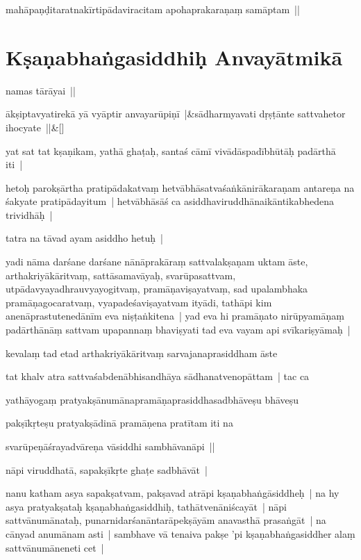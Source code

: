 \documentclass[article,12pt,a4paper]{memoir}
\begin{document}
	  \pstart mahāpaṇḍitaratnakīrtipādaviracitam apohaprakaraṇaṃ samāptam || 
	\pend
      
	  
	
\chapter[{Kṣaṇabhaṅgasiddhiḥ Anvayātmikā}]{Kṣaṇabhaṅgasiddhiḥ Anvayātmikā}\label{Kṣaṇabhaṅgasiddhiḥ_Anvayātmikā}

	  \pstart namas tārāyai ||
	\pend
      
	    
	    \stanza[\smallbreak]
	ākṣiptavyatirekā yā vyāptir anvayarūpiṇī |&sādharmyavati dṛṣṭānte sattvahetor ihocyate ||\&[\smallbreak]


	

	  \pstart yat sat tat kṣaṇikam, yathā ghaṭaḥ, santaś cāmī vivādāspadībhūtāḥ padārthā iti |
	\pend
      

	  \pstart hetoḥ parokṣārtha pratipādakatvaṃ hetvābhāsatvaśaṅkānirākaraṇam antareṇa na śakyate pratipādayitum | hetvābhāsāś ca asiddhaviruddhānaikāntikabhedena trividhāḥ |
	\pend
      

	  \pstart tatra na tāvad ayam asiddho hetuḥ | 
	\pend
      

	  \pstart yadi nāma darśane darśane nānāprakāraṃ sattvalakṣaṇam uktam āste, arthakriyākāritvaṃ, sattāsamavāyaḥ, svarūpasattvam, utpādavyayadhrauvyayogitvaṃ, pramāṇaviṣayatvaṃ, sad upalambhaka pramāṇagocaratvaṃ, vyapadeśaviṣayatvam ityādi, tathāpi kim anenāprastutenedānīm eva niṣṭaṅkitena | yad eva hi pramāṇato nirūpyamāṇaṃ padārthānāṃ sattvam upapannaṃ bhaviṣyati tad eva vayam api svīkariṣyāmaḥ | 
	\pend
      

	  \pstart kevalaṃ tad etad arthakriyākāritvaṃ sarvajanaprasiddham āste
	\pend
      

	  \pstart tat khalv atra sattvaśabdenābhisandhāya sādhanatvenopāttam | tac ca
	\pend
      

	  \pstart yathāyogaṃ pratyakṣānumānapramāṇaprasiddhasadbhāveṣu bhāveṣu
	\pend
      

	  \pstart pakṣīkṛteṣu pratyakṣādinā pramāṇena pratītam iti na
	\pend
      

	  \pstart svarūpeṇāśrayadvāreṇa vāsiddhi sambhāvanāpi ||
	\pend
      

	  \pstart nāpi viruddhatā, sapakṣīkṛte ghaṭe sadbhāvāt |
	\pend
      

	  \pstart nanu katham asya sapakṣatvam, pakṣavad atrāpi kṣaṇabhaṅgāsiddheḥ | na hy asya pratyakṣataḥ kṣaṇabhaṅgasiddhiḥ, tathātvenāniścayāt | nāpi sattvānumānataḥ, punarnidarśanāntarāpekṣāyām anavasthā prasaṅgāt | na cānyad anumānam asti | sambhave vā tenaiva pakṣe 'pi kṣaṇabhaṅgasiddher alaṃ sattvānumāneneti cet |
	\pend
      
\end{document}
